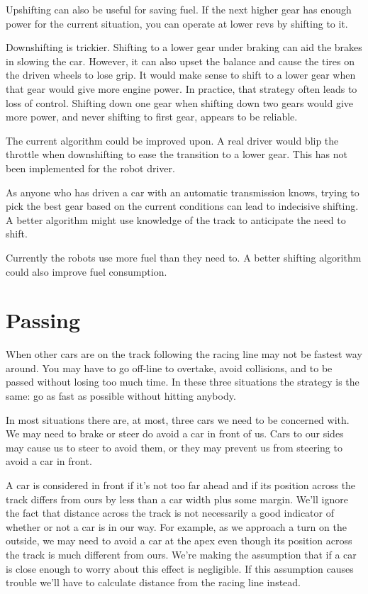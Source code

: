 \documentclass{article}
\begin{document}
Upshifting can also be useful for saving fuel.  If the next higher gear has
enough power for the current situation, you can operate at lower revs by
shifting to it.

Downshifting is trickier.  Shifting to a lower gear under braking can aid the
brakes in slowing the car.  However, it can also upset the balance and cause the
tires on the driven wheels to lose grip.  It would make sense to shift to a
lower gear when that gear would give more engine power.  In practice, that
strategy often leads to loss of control.  Shifting down one gear when shifting
down two gears would give more power, and never shifting to first gear, appears
to be reliable.

The current algorithm could be improved upon.  A real driver would blip the
throttle when downshifting to ease the transition to a lower gear.  This has not
been implemented for the robot driver.

As anyone who has driven a car with an automatic transmission knows, trying to
pick the best gear based on the current conditions can lead to indecisive
shifting.  A better algorithm might use knowledge of the track to anticipate the
need to shift.

Currently the robots use more fuel than they need to.  A better shifting
algorithm could also improve fuel consumption.

\section{Passing}
When other cars are on the track following the racing line may not be fastest
way around. You may have to go off-line to overtake, avoid collisions, and to be
passed without losing too much time. In these three situations the strategy is
the same: go as fast as possible without hitting anybody.

In most situations there are, at most, three cars we need to be concerned with.
We may need to brake or steer do avoid a car in front of us. Cars to our sides
may cause us to steer to avoid them, or they may prevent us from steering to
avoid a car in front.

A car is considered in front if it's not too far ahead and if its position
across the track differs from ours by less than a car width plus some
margin. We'll ignore the fact that distance across the track is not necessarily
a good indicator of whether or not a car is in our way. For example, as we
approach a turn on the outside, we may need to avoid a car at the apex even
though its position across the track is much different from ours.  We're making
the assumption that if a car is close enough to worry about this effect is
negligible. If this assumption causes trouble we'll have to calculate distance
from the racing line instead.
\end{document}
